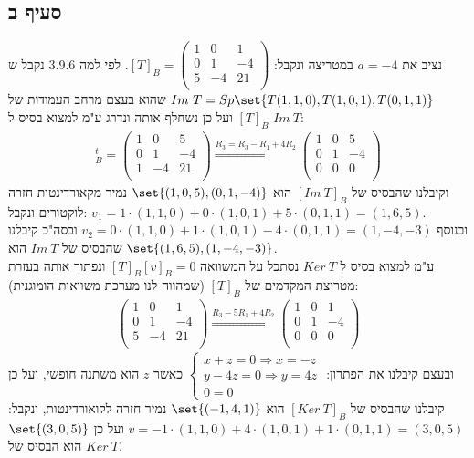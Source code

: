 \documentclass{article}
\DeclarePairedDelimiter\set\{\}
\begin{document}
	\subsection*{סעיף ב}
	נציב את $a=-4$ במטריצה ונקבל:
	$[T]_B = \begin{pmatrix}
		1 & 0 & 1 \\
		0 & 1 & -4 \\
		5 & -4 & 21 \\
	\end{pmatrix}$.
	לפי למה 3.9.6 נקבל ש $Im \ T = Sp\set{T(1,1,0), T(1,0,1), T(0,1,1)}$ שהוא בעצם מרחב העמודות של $[T]_B$ ועל כן נשחלף אותה ונדרג ע"מ למצוא בסיס ל $Im \ T$:
	\begin{align*}
		[T]_B^t = \begin{pmatrix}
			1 & 0 & 5 \\
			0 & 1 & -4 \\
			1 & -4 & 21 \\
		\end{pmatrix} \overset{R_3 = R_3 - R_1 + 4R_2}\Rightarrow
		\begin{pmatrix}
			1 & 0 & 5 \\
			0 & 1 & -4 \\
			0 & 0 & 0 \\
		\end{pmatrix}
	\end{align*}
	וקיבלנו שהבסיס של $[Im \ T]_B$ הוא $\set{(1,0,5), (0,1,-4)}$ נמיר מקאורדינטות חזרה לוקטורים ונקבל: $v_1 = 1 \cdot (1,1,0) + 0 \cdot (1,0,1) + 5 \cdot (0,1,1) = (1,6,5)$. \\
	ובנוסף $v_2 = 0 \cdot (1,1,0) + 1 \cdot (1,0,1) -4 \cdot (0,1,1) = (1,-4, -3)$
	ובסה"כ קיבלנו שהבסיס של $Im \ T$ הוא $\set{(1,6,5), (1,-4,-3)}$. \\
	ע"מ למצוא בסיס ל $Ker \ T$ נסתכל על המשוואה $[T]_B[v]_B = 0$ ונפתור אותה בעזרת מטריצת המקדמים של $[T]_B$ (שמהווה לנו מערכת משוואות הומוגנית):
	\begin{align*}
		\begin{pmatrix}
			1 & 0 & 1 \\
			0 & 1 & -4 \\
			5 & -4 & 21 \\
		\end{pmatrix}
		\overset{R_3 - 5R_1 + 4R_2}\Rightarrow
		\begin{pmatrix}
			1 & 0 & 1 \\
			0 & 1 & -4 \\
			0 & 0 & 0 \\
		\end{pmatrix}
	\end{align*}
	ובעצם קיבלנו את הפתרון: $\begin{cases}
		x + z = 0 \Rightarrow x = -z\\
		y - 4z = 0 \Rightarrow y = 4z\\
		0 = 0
	\end{cases}$
	כאשר $z$ הוא משתנה חופשי, ועל כן קיבלנו שהבסיס של $[Ker \ T]_B$ הוא $\set{(-1,4,1)}$ נמיר חזרה לקואורדינטות, ונקבל:
	$v = -1 \cdot (1,1,0) + 4 \cdot (1,0,1) + 1 \cdot (0,1,1) = (3, 0, 5)$ ועל כן $\set{(3,0,5)}$ הוא הבסיס של $Ker \ T$.
\end{document}
